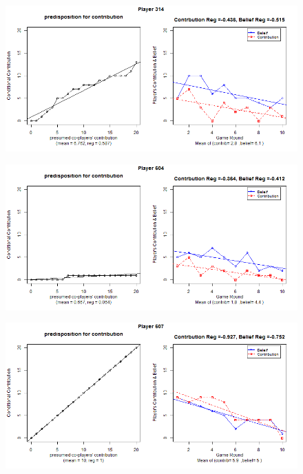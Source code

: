\begin{figure}[!h]
	\includegraphics[scale=0.5]{images/appendixB/P314.png}
\end{figure}

\begin{figure}[!h]
	\includegraphics[scale=0.5]{images/appendixB/P604.png}
\end{figure}

\begin{figure}[!h]
	\includegraphics[scale=0.5]{images/appendixB/P607.png}
\end{figure}

